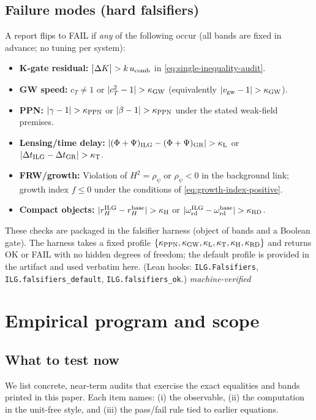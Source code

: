 \documentclass[12pt,a4paper]{article}
\begin{document}
\subsection{Failure modes (hard falsifiers)}
A report flips to \textsc{FAIL} if \emph{any} of the following occur (all bands are fixed in advance; no tuning per system):
\begin{itemize}
  \item \textbf{K-gate residual:} \(\bigl|\Delta K\bigr|>k\,u_{\rm comb}\) in \eqref{eq:single-inequality-audit}.
  \item \textbf{GW speed:} \(c_T\neq 1\) or \(|c_T^2-1|>\kappa_{\rm GW}\) (equivalently \(|v_{\rm gw}-1|>\kappa_{\rm GW}\)).
  \item \textbf{PPN:} \(|\gamma-1|>\kappa_{\rm PPN}\) or \(|\beta-1|>\kappa_{\rm PPN}\) under the stated weak-field premises.
  \item \textbf{Lensing/time delay:} \(|(\Phi+\Psi)_{\rm ILG}-(\Phi+\Psi)_{\rm GR}|>\kappa_{\rm L}\) or \(|\Delta t_{\rm ILG}-\Delta t_{\rm GR}|>\kappa_{\rm T}\).
  \item \textbf{FRW/growth:} Violation of \(H^2=\rho_\psi\) or \(\rho_\psi<0\) in the background link; growth index \(f\le 0\) under the conditions of \eqref{eq:growth-index-positive}.
  \item \textbf{Compact objects:} \(|r_H^{\rm ILG}-r_H^{\rm base}|>\kappa_{\rm H}\) or \(|\omega_{\rm rd}^{\rm ILG}-\omega_{\rm rd}^{\rm base}|>\kappa_{\rm RD}\).
\end{itemize}
These checks are packaged in the falsifier harness (object of bands and a Boolean gate). The harness takes a fixed profile \(\{\kappa_{\rm PPN},\kappa_{\rm GW},\kappa_{\rm L},\kappa_{\rm T},\kappa_{\rm H},\kappa_{\rm RD}\}\) and returns \textsc{OK} or \textsc{FAIL} with no hidden degrees of freedom; the default profile is provided in the artifact and used verbatim here. (Lean hooks: \texttt{ILG.Falsifiers}, \texttt{ILG.falsifiers\_default}, \texttt{ILG.falsifiers\_ok}.) \emph{machine-verified}

\section{Empirical program and scope}

\subsection{What to test now}
We list concrete, near-term audits that exercise the exact equalities and bands printed in this paper. Each item names: (i) the observable, (ii) the computation in the unit-free style, and (iii) the pass/fail rule tied to earlier equations.
\end{document}
